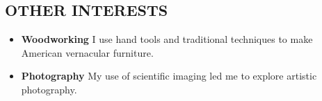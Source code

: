 \documentclass{res}
\begin{document}
\begin{resume}


 \section{OTHER INTERESTS}
   \begin{itemize}
     \item \textbf{Woodworking}	I use hand tools and traditional techniques to make American vernacular furniture.
     \item \textbf{Photography}	My use of scientific imaging led me to explore artistic photography.
   \end{itemize}


\end{resume}
\end{document}
